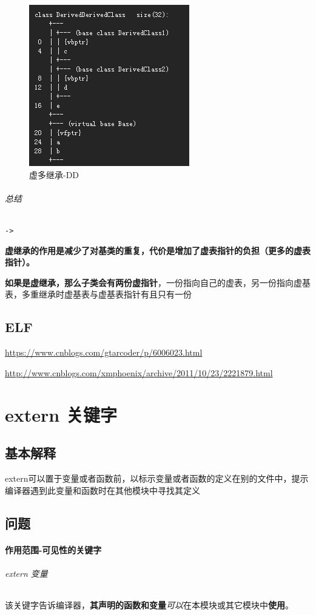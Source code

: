 \documentclass[UTF8,a4paper,12pt]{ctexbook} %
\begin{document}
				\begin{figure}[H]
					\centering
					\includegraphics[scale = 0.8]{virtualDerivedDerivedVirutal.png}
					\caption{虚多继承-DD}
				\end{figure}
		
			\subparagraph{总结} \verb|->|
				
			\textbf{虚继承的作用是减少了对基类的重复，代价是增加了虚表指针的负担（更多的虚表指针）。}
			
			\textbf{如果是虚继承，那么子类会有两份虚指针}，一份指向自己的虚表，另一份指向虚基表，多重继承时虚基表与虚基表指针有且只有一份
			
	\newpage		
	\section{ELF}
		\url{https://www.cnblogs.com/gtarcoder/p/6006023.html}	
		
		\url{http://www.cnblogs.com/xmphoenix/archive/2011/10/23/2221879.html}
\chapter{extern 关键字}
       
     \section{基本解释}extern可以置于变量或者函数前，以标示变量或者函数的定义在别的文件中，提示编译器遇到此变量和函数时在其他模块中寻找其定义
       
     \section{问题}
	     \subsubsection{作用范围-可见性的关键字}
	        \subparagraph{extern 变量}
		        该关键字告诉编译器，\textbf{其声明的函数和变量}\textit{可以}在本模块或其它模块中\textbf{使用}。
		        
\end{document}
